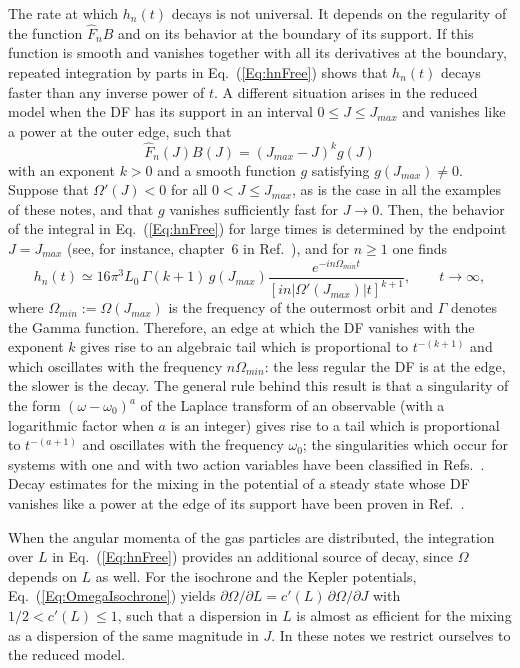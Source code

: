 The rate at which $h_n(t)$ decays is not universal. It depends on the regularity of the function $\hat{F}_n B$ and on its behavior at the boundary of its support. If this function is smooth and vanishes together with all its derivatives at the boundary, repeated integration by parts in Eq.~(\ref{Eq:hnFree}) shows that $h_n(t)$ decays faster than any inverse power of $t$. A different situation arises in the reduced model when the DF has its support in an interval $0\leq J\leq J_{max}$ and vanishes like a power at the outer edge, such that
\begin{equation}
\hat{F}_n(J) B(J) = (J_{max} - J)^k g(J)
\label{Eq:EdgeBehavior}
\end{equation}
with an exponent $k > 0$ and a smooth function $g$ satisfying $g(J_{max})\neq 0$. Suppose that $\Omega'(J) < 0$ for all $0 < J\leq J_{max}$, as is the case in all the examples of these notes, and that $g$ vanishes sufficiently fast for $J\to 0$. Then, the behavior of the integral in Eq.~(\ref{Eq:hnFree}) for large times is determined by the endpoint $J = J_{max}$ (see, for instance, chapter~6 in Ref.~\cite{BenderOrszag-Book}), and for $n\geq 1$ one finds
\begin{equation}
h_n(t)\simeq 16\pi^3 L_0\,\Gamma(k+1)\, g(J_{max})\frac{e^{-in\Omega_{min} t}}{\left[ i n |\Omega'(J_{max})| t \right]^{k+1}},\qquad t\to \infty,
\label{Eq:Tail}
\end{equation}
where $\Omega_{min} := \Omega(J_{max})$ is the frequency of the outermost orbit and $\Gamma$ denotes the Gamma function. Therefore, an edge at which the DF vanishes with the exponent $k$ gives rise to an algebraic tail which is proportional to $t^{-(k+1)}$ and which oscillates with the frequency $n\Omega_{min}$: the less regular the DF is at the edge, the slower is the decay. The general rule behind this result is that a singularity of the form $(\omega - \omega_0)^a$ of the Laplace transform of an observable (with a logarithmic factor when $a$ is an integer) gives rise to a tail which is proportional to $t^{-(a+1)}$ and oscillates with the frequency $\omega_0$; the singularities which occur for systems with one and with two action variables have been classified in Refs.~\cite{jBaOyY11,jByY13}. Decay estimates for the mixing in the potential of a steady state whose DF vanishes like a power at the edge of its support have been proven in Ref.~\cite{mHgRmScS24}.

When the angular momenta of the gas particles are distributed, the integration over $L$ in Eq.~(\ref{Eq:hnFree}) provides an additional source of decay, since $\Omega$ depends on $L$ as well. For the isochrone and the Kepler potentials, Eq.~(\ref{Eq:OmegaIsochrone}) yields $\partial\Omega/\partial L = c'(L)\,\partial\Omega/\partial J$ with $1/2 < c'(L)\leq 1$, such that a dispersion in $L$ is almost as efficient for the mixing as a dispersion of the same magnitude in $J$. In these notes we restrict ourselves to the reduced model.

